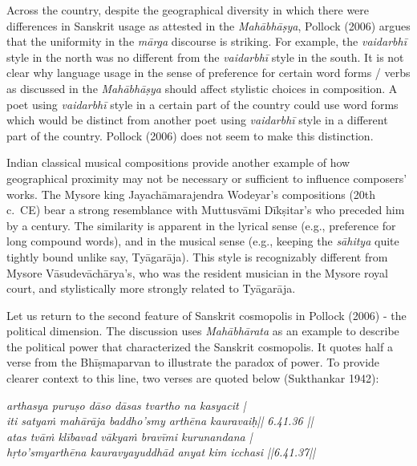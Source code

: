 Across the country, despite the geographical diversity in which there were differences in Sanskrit usage as attested in the {\sl Mahābhāṣya}, Pollock (2006) argues that the uniformity in the {\sl mārga} discourse is striking. For example, the {\sl vaidarbhī} style in the north was no different from the {\sl vaidarbhī} style in the south. It is not clear why language usage in the sense of preference for certain word forms / verbs as discussed in the {\sl Mahābhāṣya} should affect stylistic choices in composition. A poet using {\sl vaidarbhī} style in a certain part of the country could use word forms which would be distinct from another poet using {\sl vaidarbhī} style in a different part of the country. Pollock (2006) does not seem to make this distinction.

Indian classical musical compositions provide another example of how geographical proximity may not be necessary or sufficient to influence composers’ works. The Mysore king Jayachāmarajendra Wodeyar’s compositions (20th c.\ CE) bear a strong resemblance with Muttusvāmi Dīkṣitar’s who preceded him by a century. The similarity is apparent in the lyrical sense (e.g., preference for long compound words), and in the musical sense (e.g., keeping the {\sl sāhitya} quite tightly bound unlike say, Tyāgarāja). This style is recognizably different from Mysore Vāsudevāchārya’s, who was the resident musician in the Mysore royal court, and stylistically more strongly related to Tyāgarāja. 

Let us return to the second feature of Sanskrit cosmopolis in Pollock (2006) - the political dimension. The discussion uses {\sl Mahābhārata} as an example to describe the political power that characterized the Sanskrit cosmopolis. It quotes half a verse from the Bhīṣmaparvan to illustrate the paradox of power. To provide clearer context to this line, two verses are quoted below (Sukthankar 1942):
\begin{myquote}
{\sl arthasya puruṣo dāso dāsas tvartho na kasyacit |\\
iti satyaṁ mahārāja baddho'smy arthēna kauravaiḥ|| 6.41.36 ||\\
atas tvāṁ klībavad vākyaṁ bravīmi kurunandana |\\
hṛto'smyarthēna kauravyayuddhād anyat kim icchasi ||6.41.37||}
\end{myquote}

